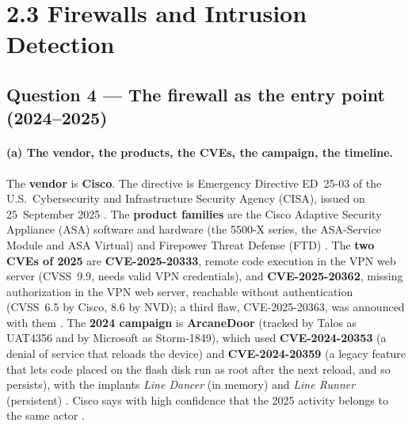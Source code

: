 \documentclass[11pt,a4paper]{article}
\begin{document}
\section*{2.3 Firewalls and Intrusion Detection}

\subsection*{Question 4 --- The firewall as the entry point (2024--2025)}

\paragraph{(a) The vendor, the products, the CVEs, the campaign, the timeline.} The \textbf{vendor} is \textbf{Cisco}. The directive is Emergency
Directive ED~25-03 of the U.S.\ Cybersecurity and Infrastructure Security Agency (CISA), issued on 25~September 2025 \cite{ed2503}. The
\textbf{product families} are the Cisco Adaptive Security Appliance (ASA) software and hardware (the 5500-X series, the ASA-Service Module and ASA
Virtual) and Firepower Threat Defense (FTD) \cite{ed2503,ciscoevent}. The \textbf{two CVEs of 2025} are \textbf{CVE-2025-20333}, remote code execution in the VPN web server
(CVSS~9.9, needs valid VPN credentials), and \textbf{CVE-2025-20362}, missing authorization in the VPN web server, reachable without authentication
(CVSS~6.5 by Cisco, 8.6 by NVD); a third flaw, CVE-2025-20363, was announced with them \cite{ciscoadv,ciscoevent,nvd}. The \textbf{2024 campaign} is
\textbf{ArcaneDoor} (tracked by Talos as UAT4356 and by Microsoft as Storm-1849), which used \textbf{CVE-2024-20353} (a denial of service that reloads the device) and
\textbf{CVE-2024-20359} (a legacy feature that lets code placed on the flash disk run as root after the next reload, and so persists), with the implants
\emph{Line Dancer} (in memory) and \emph{Line Runner} (persistent) \cite{talos,nvd}. Cisco says with high confidence that the 2025 activity belongs to the same actor
\cite{ciscoevent}.
\end{document}
